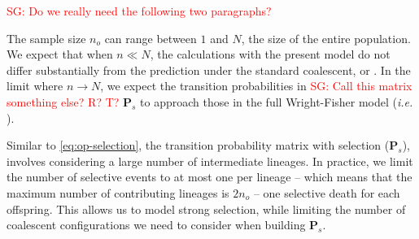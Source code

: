 \documentclass[review]{elsarticle}
\newcommand{\ra}{\rightarrow}
\newcommand{\Dfrac}[2]{%
  \ooalign{%
    $\genfrac{}{}{1.2pt}0{#1}{#2}$\cr%
    $\color{white}\genfrac{}{}{.4pt}0{\phantom{#1}}{\phantom{#2}}$}%
}
\newcommand{\cond}{\middle\vert}
\newcommand{\sgcomment}[1]{\textcolor{red}{SG: #1}}
\begin{document}
%
%

\sgcomment{Do we really need the following two paragraphs?}

The sample size $n_o$ can range between $1$ and $N$, the size of the entire population. We expect that 
when $n\ll N$, the calculations with the present model do not differ substantially from the
prediction under the standard coalescent, or \citep{JouganousEtAl2017}. In the limit where
$n \ra N$, we expect the transition probabilities in \sgcomment {Call this matrix something else? R? T?} $\mathbf{P}_s$ to approach those in the full
Wright-Fisher model (\textit{i.e.} \cite[eq. 1.58]{Ewens2004}).

Similar to \eqref{eq:op-selection}, the transition probability matrix with selection
($\mathbf{P}_s$), involves considering a large number of intermediate lineages. In practice, we
limit the number of selective events to at most one per lineage -- which means that the maximum
number of contributing lineages is $2n_o$ -- one selective death for each offspring. This allows us
to model strong selection, while limiting the number of coalescent configurations we need to
consider when building $\mathbf{P}_s$. 

\end{document}
